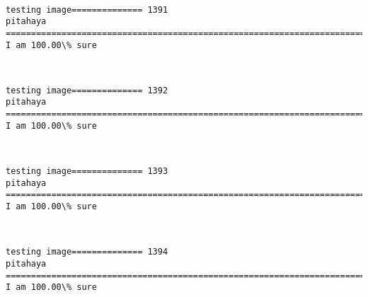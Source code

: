 \documentclass[11pt]{article}
\begin{document}
    \begin{center}
    \end{center}
    { \hspace*{\fill} \\}
    
    \begin{Verbatim}[commandchars=\\\{\}]
testing image============== 1391
pitahaya
============================================================================
I am 100.00\% sure

    \end{Verbatim}

    \begin{center}
    \end{center}
    { \hspace*{\fill} \\}
    
    \begin{Verbatim}[commandchars=\\\{\}]
testing image============== 1392
pitahaya
============================================================================
I am 100.00\% sure

    \end{Verbatim}

    \begin{center}
    \end{center}
    { \hspace*{\fill} \\}
    
    \begin{Verbatim}[commandchars=\\\{\}]
testing image============== 1393
pitahaya
============================================================================
I am 100.00\% sure

    \end{Verbatim}

    \begin{center}
    \end{center}
    { \hspace*{\fill} \\}
    
    \begin{Verbatim}[commandchars=\\\{\}]
testing image============== 1394
pitahaya
============================================================================
I am 100.00\% sure

    \end{Verbatim}
\end{document}
